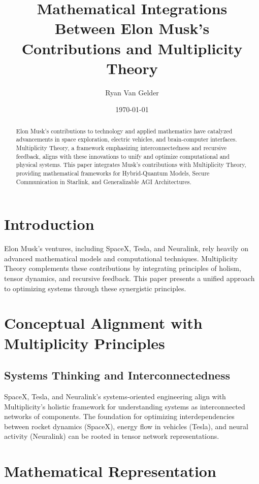 \documentclass{article}
\theoremstyle{plain}
\begin{document}
\title{Mathematical Integrations Between Elon Musk's Contributions and Multiplicity Theory}

\author{Ryan Van Gelder}
\date{\today}
\maketitle

\begin{abstract}
Elon Musk's contributions to technology and applied mathematics have catalyzed advancements in space exploration, electric vehicles, and brain-computer interfaces. Multiplicity Theory, a framework emphasizing interconnectedness and recursive feedback, aligns with these innovations to unify and optimize computational and physical systems. This paper integrates Musk's contributions with Multiplicity Theory, providing mathematical frameworks for Hybrid-Quantum Models, Secure Communication in Starlink, and Generalizable AGI Architectures.
\end{abstract}

\section{Introduction}
Elon Musk's ventures, including SpaceX, Tesla, and Neuralink, rely heavily on advanced mathematical models and computational techniques. Multiplicity Theory complements these contributions by integrating principles of holism, tensor dynamics, and recursive feedback. This paper presents a unified approach to optimizing systems through these synergistic principles.

\section{Conceptual Alignment with Multiplicity Principles}
\subsection{Systems Thinking and Interconnectedness}
SpaceX, Tesla, and Neuralink's systems-oriented engineering align with Multiplicity’s holistic framework for understanding systems as interconnected networks of components. The foundation for optimizing interdependencies between rocket dynamics (SpaceX), energy flow in vehicles (Tesla), and neural activity (Neuralink) can be rooted in tensor network representations.

\section{Mathematical Representation}
\end{document}
